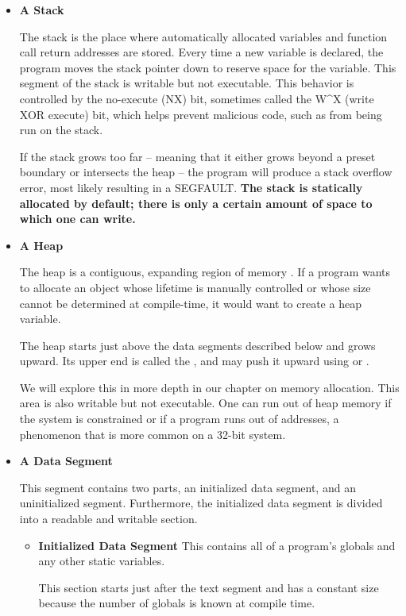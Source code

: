 \begin{itemize}
\item \textbf{A Stack}

The stack is the place where automatically allocated variables and function call return addresses are stored.
Every time a new variable is declared, the program moves the stack pointer down to reserve space for the variable.
This segment of the stack is writable but not executable.
This behavior is controlled by the no-execute (NX) bit, sometimes called the W\^{}X (write XOR execute) bit, which helps prevent malicious code, such as  from being run on the stack.

If the stack grows too far -- meaning that it either grows beyond a preset boundary or intersects the heap -- the program will produce a stack overflow error, most likely resulting in a SEGFAULT.
\textbf{The stack is statically allocated by default; there is only a certain amount of space to which one can write.}

\item \textbf{A Heap}

The heap is a contiguous, expanding region of memory \cite{mallocinternals}.
If a program wants to allocate an object whose lifetime is manually controlled or whose size cannot be determined at compile-time, it would want to create a heap variable.

The heap starts just above the data segments described below and grows upward.
Its upper end is called the , and  may push it upward using  or .

We will explore this in more depth in our chapter on memory allocation.
This area is also writable but not executable.
One can run out of heap memory if the system is constrained or if a program runs out of addresses, a phenomenon that is more common on a 32-bit system.

\item \textbf{A Data Segment}

This segment contains two parts, an initialized data segment, and an uninitialized segment.
Furthermore, the initialized data segment is divided into a readable and writable section.

\begin{itemize}
    \item \textbf{Initialized Data Segment}
          This contains all of a program's globals and any other static variables.

          This section starts just after the text segment and has a constant size because the number of globals is known at compile time.


\end{itemize}
\end{itemize}
